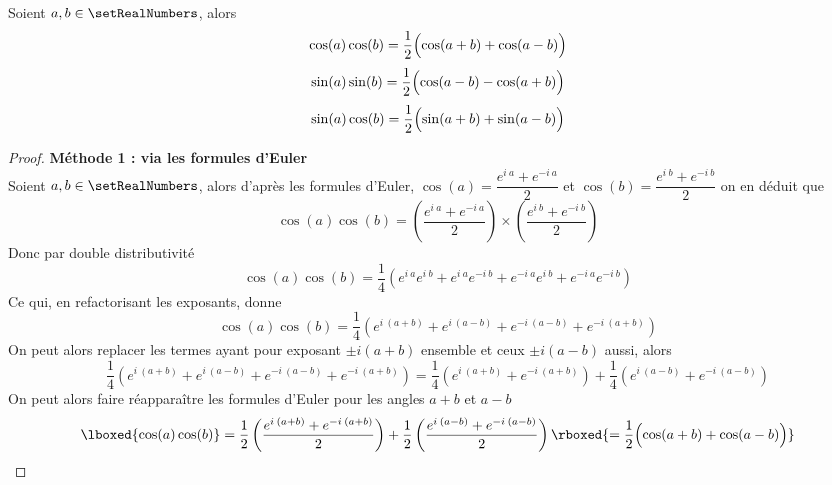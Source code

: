 \begin{lemma}
\label{trigonometrie:linearisation:sinus_et_cosinus}
Soient $a, b \in \setRealNumbers$, alors
\[
\cos(a)\cos(b) = \dfrac{1}{2}\Bigl(\cos(a+b)+\cos(a-b)\Bigr)
\]
\[
\sin(a)\sin(b) = \dfrac{1}{2}\Bigl(\cos(a-b)-\cos(a+b)\Bigr)
\]
\[
\sin(a)\cos(b) = \dfrac{1}{2}\Bigl(\sin(a+b)+\sin(a-b)\Bigr)
\]
\end{lemma}

\begin{proof}
\textbf{Méthode 1 : via les formules d'Euler} \\
Soient $a, b \in \setRealNumbers$, alors d'après les formules d'Euler, $\cos(a) = \dfrac{e^{i \: a}+ e^{-i \: a}}{2}$ et $\cos(b) = \dfrac{e^{i\:b}+ e^{-i\:b}}{2}$ on en déduit que
\[
\cos(a)\cos(b) 
= \left(\dfrac{e^{i \:a}+ e^{-i\: a}}{2}\right) \times  \left(\dfrac{e^{i \:b}+ e^{-i\: b}}{2}\right)
\]
Donc par double distributivité 
\[
\cos(a)\cos(b) 
= \dfrac{1}{4}\left(e^{i \:a}e^{i \:b}+e^{i \:a}e^{-i \:b}+ e^{-i \:a}e^{i \:b}+ e^{-i \:a}e^{-i \:b}\right) 
\]
Ce qui, en refactorisant les exposants, donne
\[
\cos(a)\cos(b) = \dfrac{1}{4}\left(e^{i \:(a+b)}+e^{i \:(a-b)}+ e^{-i \:(a - b)}+ e^{-i \:(a +b)}\right)
\]
On peut alors replacer les termes ayant pour exposant $\pm i(a+b)$ ensemble et ceux $\pm i (a-b)$ aussi, alors
\[
\dfrac{1}{4}\left(e^{i \:(a+b)}+e^{i \:(a-b)}+ e^{-i \:(a - b)}+ e^{-i \:(a +b)}\right)
= \dfrac{1}{4}\left(e^{i \:(a+b)}+ e^{-i \:(a + b)}\right) + \dfrac{1}{4}\left(e^{i \:(a-b)}+ e^{-i \:(a - b)}\right)
\]
On peut alors faire réapparaître les formules d'Euler pour les angles $a+b$ et $a-b$ 
\[
\lboxed{\cos(a)\cos(b)} 
=\dfrac{1}{2}\left(\dfrac{e^{i \:(a+b)}+ e^{-i \:(a + b)}}{2}\right) + \dfrac{1}{2}\left(\dfrac{e^{i \:(a-b)}+ e^{-i \:(a - b)}}{2}\right) 
\rboxed{=  \dfrac{1}{2}\Bigl(\cos(a+b)+\cos(a-b)\Bigr)}
\]


\end{proof}
